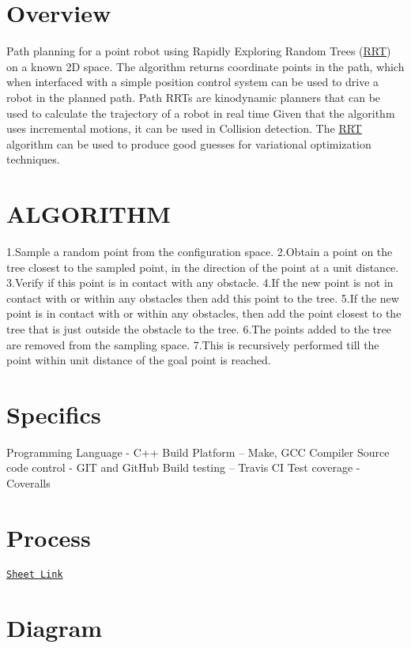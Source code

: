 \hypertarget{index_Overview}{}\section{Overview}\label{index_Overview}
Path planning for a point robot using Rapidly Exploring Random Trees (\hyperlink{classRRT}{R\+RT}) on a known 2D space. The algorithm returns coordinate points in the path, which when interfaced with a simple position control system can be used to drive a robot in the planned path. Path R\+R\+Ts are kinodynamic planners that can be used to calculate the trajectory of a robot in real time Given that the algorithm uses incremental motions, it can be used in Collision detection. The \hyperlink{classRRT}{R\+RT} algorithm can be used to produce good guesses for variational optimization techniques.\hypertarget{index_RRT}{}\section{A\+L\+G\+O\+R\+I\+T\+HM}\label{index_RRT}
1.\+Sample a random point from the configuration space. 2.\+Obtain a point on the tree closest to the sampled point, in the direction of the point at a unit distance. 3.\+Verify if this point is in contact with any obstacle. 4.\+If the new point is not in contact with or within any obstacles then add this point to the tree. 5.\+If the new point is in contact with or within any obstacles, then add the point closest to the tree that is just outside the obstacle to the tree. 6.\+The points added to the tree are removed from the sampling space. 7.\+This is recursively performed till the point within unit distance of the goal point is reached.\hypertarget{index_Project}{}\section{Specifics}\label{index_Project}
Programming Language -\/ C++ Build Platform – Make, G\+CC Compiler Source code control -\/ G\+IT and Git\+Hub Build testing – Travis CI Test coverage -\/ Coveralls\hypertarget{index_Agile}{}\section{Process}\label{index_Agile}
\href{https://docs.google.com/spreadsheets/d/1cJVLNv9pZ2T4a17OsMPn_WnxRS6tAkfYJKaMcSRo6MA/edit?usp=sharing}{\tt Sheet Link}\hypertarget{index_Class}{}\section{Diagram}\label{index_Class}
